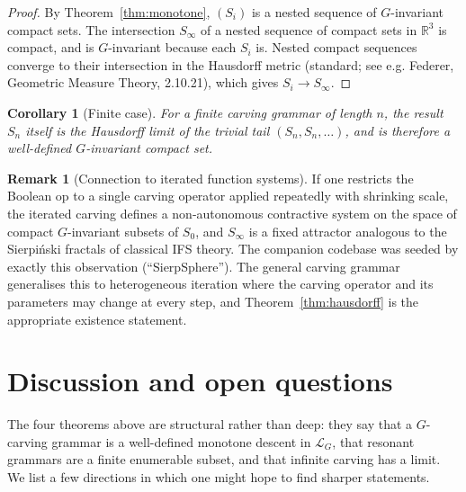 \documentclass[11pt]{article}
\newtheorem{corollary}[theorem]{Corollary}
\theoremstyle{definition}
\newtheorem{remark}[theorem]{Remark}
\begin{document}
\begin{proof}
By Theorem~\ref{thm:monotone}, $(S_i)$ is a nested sequence of
$G$-invariant compact sets. The intersection $S_\infty$ of a nested
sequence of compact sets in $\mathbb{R}^3$ is compact, and is
$G$-invariant because each $S_i$ is. Nested compact sequences converge
to their intersection in the Hausdorff metric (standard; see e.g.
Federer, Geometric Measure Theory, 2.10.21), which gives $S_i \to
S_\infty$.
\end{proof}

\begin{corollary}[Finite case]
For a finite carving grammar of length $n$, the result $S_n$ itself is
the Hausdorff limit of the trivial tail $(S_n, S_n, \dots)$, and is
therefore a well-defined $G$-invariant compact set.
\end{corollary}

\begin{remark}[Connection to iterated function systems]
If one restricts the Boolean op to a single carving operator applied
repeatedly with shrinking scale, the iterated carving defines a
non-autonomous contractive system on the space of compact $G$-invariant
subsets of $S_0$, and $S_\infty$ is a fixed attractor analogous to the
Sierpi\'nski fractals of classical IFS theory. The companion codebase
was seeded by exactly this observation (``SierpSphere''). The general
carving grammar generalises this to heterogeneous iteration where the
carving operator and its parameters may change at every step, and
Theorem~\ref{thm:hausdorff} is the appropriate existence statement.
\end{remark}

\section{Discussion and open questions}
\label{sec:open}

The four theorems above are structural rather than deep: they say that
a $G$-carving grammar is a well-defined monotone descent in
$\mathcal{L}_G$, that resonant grammars are a finite enumerable subset,
and that infinite carving has a limit. We list a few directions in
which one might hope to find sharper statements.
\end{document}
